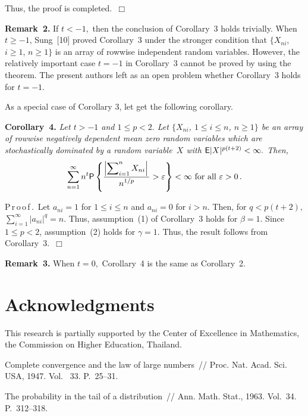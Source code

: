 \begin{multicols}{2}
Thus, the proof is completed.\hfill~$\Box$

\medskip
\noindent 
\textbf{Remark~2.} If $t<-1,$ then the conclusion of Corollary~3 holds trivially. When 
$t\ge -1$, Sung~[10] proved Corollary~3 under the stronger condition that $\{X_{ni}$, $i\ge 1$, $n\ge 1\}$ is an 
array  of rowwise
independent random variables. However, the relatively important case $t=-1$ in 
Corollary~3 cannot be proved by
using the theorem. The present authors left as an open problem whether Corollary~3 holds for $t=-1$.

\medskip
As a special case of Corollary 3, let get the following corollary.

\medskip

\noindent 
\textbf{Corollary~4.} \textit{Let $t>-1$ and $1\le p<2.$ 
Let $\{X_{ni}$, $1\le i \le n$, $n\ge 1\}$ be an array
of rowwise negatively dependent  mean zero random variables which are stochastically dominated by a random
variable~$X$ with ${\sf E}|X|^{p(t+2)}<\infty.$ Then,}
$$
\sum\limits_{n=1}^\infty n^t {\sf P}\left\{ \displaystyle\frac{\displaystyle \left|\sum\nolimits_{i=1}^n X_{ni}\right|\mathstrut}{\displaystyle n^{1/p}\mathstrut}>
\varepsilon\right\}<\infty
\mbox{ for all } \varepsilon>0\,.
$$

\noindent 
P\,r\,o\,o\,f\,.\ Let $a_{ni}=1$ for $1\le i\le n$ and $a_{ni}=0$ for $i>n.$ 
Then, for $q<p(t+2),$
$\sum\limits_{i=1}^\infty |a_{ni}|^q=n.$ Thus, assumption~(1) of Corollary~3 holds for 
$\beta=1$. Since $1\le p<2$,
assumption~(2) holds for $\gamma=1$. Thus, the result follows from Corollary~3.\hfill~$\Box$

\medskip

\noindent 
\textbf{Remark~3.} When $t=0,$  Corollary~4 is the same as Corollary~2.

\section*{Acknowledgments} 

\noindent
This research is partially supported by the 
Center of Excellence in Mathematics, the Commission on Higher Education, Thailand.

  {\small\frenchspacing
{%
\begin{thebibliography}{99}

Complete convergence and the law of large numbers~// Proc. Nat. Acad. Sci. USA, 1947.
Vol.~ 33. P.~25--31.

  The probability in the tail of a distribution~//
Ann. Math. Stat., 1963. Vol.~34. P.~312--318.


\end{thebibliography}}}
\end{multicols}
